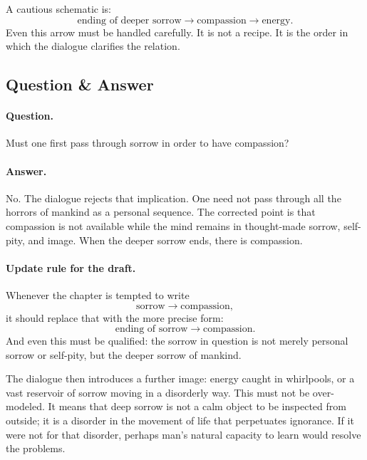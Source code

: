 A cautious schematic is:
\begin{equation}
\text{ending of deeper sorrow}
\longrightarrow
\text{compassion}
\longrightarrow
\text{energy}.
\end{equation}
Even this arrow must be handled carefully. It is not a recipe. It is the order in which the dialogue clarifies the relation.

\subsection{Question \& Answer}

\paragraph{Question.}
Must one first pass through sorrow in order to have compassion?

\paragraph{Answer.}
No. The dialogue rejects that implication. One need not pass through all the horrors of mankind as a personal sequence. The corrected point is that compassion is not available while the mind remains in thought-made sorrow, self-pity, and image. When the deeper sorrow ends, there is compassion.

\paragraph{Update rule for the draft.}
Whenever the chapter is tempted to write
\begin{equation}
\text{sorrow} \longrightarrow \text{compassion},
\end{equation}
it should replace that with the more precise form:
\begin{equation}
\text{ending of sorrow}
\longrightarrow
\text{compassion}.
\end{equation}
And even this must be qualified: the sorrow in question is not merely personal sorrow or self-pity, but the deeper sorrow of mankind.

The dialogue then introduces a further image: energy caught in whirlpools, or a vast reservoir of sorrow moving in a disorderly way. This must not be over-modeled. It means that deep sorrow is not a calm object to be inspected from outside; it is a disorder in the movement of life that perpetuates ignorance. If it were not for that disorder, perhaps man's natural capacity to learn would resolve the problems.

